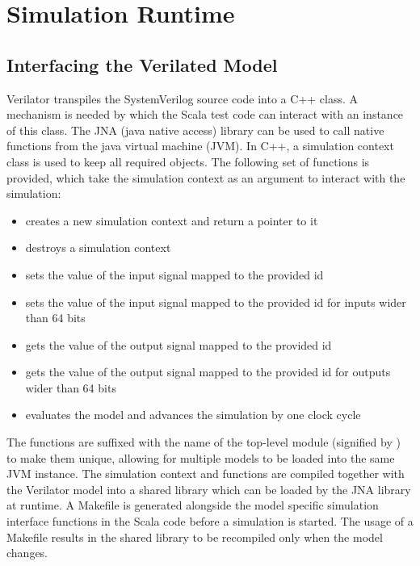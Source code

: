 \section{Simulation Runtime} %

\subsection{Interfacing the Verilated Model} %

Verilator transpiles the SystemVerilog source code into a C++ class. A mechanism is needed by which the Scala test
code can interact with an instance of this class. The JNA (java native access) library can be used to call native
functions from the java virtual machine (JVM). In C++, a simulation context class is used to keep all required
objects. The following set of functions is provided, which take the simulation context as an argument to interact
with the simulation:

\begin{itemize}
  \item {} creates a new simulation context and return a pointer to it
  \item {} destroys a simulation context
  \item {} sets the value of the input signal mapped to the provided id
  \item {} sets the value of the input signal mapped to the provided id for inputs wider than 64 bits
  \item {} gets the value of the output signal mapped to the provided id
  \item {} gets the value of the output signal mapped to the provided id for outputs wider than 64 bits
  \item {} evaluates the model and advances the simulation by one clock cycle
\end{itemize}

The functions are suffixed with the name of the top-level module (signified by ) to make them unique,
allowing for multiple models to be loaded into the same JVM instance. The simulation context and functions are
compiled together with the Verilator model into a shared library which can be loaded by the JNA library at runtime. A
Makefile is generated alongside the model specific simulation interface functions in the Scala code before a
simulation is started. The usage of a Makefile results in the shared library to be recompiled only when the model changes.

